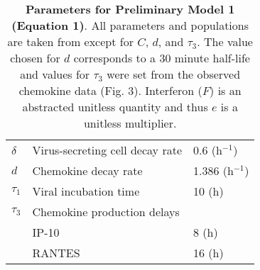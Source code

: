 \documentclass[preprint,10pt,authoryear]{article}
\begin{document}
\begin{table}[!ht]
\begin{center}
\begin{tabular}{|  l  l  l  |}
  $\delta$ & Virus-secreting cell decay rate & 0.6 (h$^{-1}$) \\
  $d$ & Chemokine decay rate & 1.386 (h$^{-1}$) \\
  $\tau_1$ & Viral incubation time & 10 (h) \\
  $\tau_3$ & Chemokine production delays & \\
    & \hspace{2em} IP-10 & 8 (h)\\
    & \hspace{2em} RANTES & 16 (h)\\
  \hline
\end{tabular}
\caption{\textbf{Parameters for Preliminary Model 1 (Equation 1)}.  All parameters and populations are taken from \citep{Mitchell2011} except for $C$, $d$, and $\tau_3$.  The value chosen for $d$ corresponds to a 30 minute half-life and values for $\tau_3$ were set from the observed chemokine data (Fig. 3).  Interferon ($F$) is an abstracted unitless quantity and thus $e$ is a unitless multiplier.}
\label{tab:dde}
\end{center}
\end{table}
\end{document}
